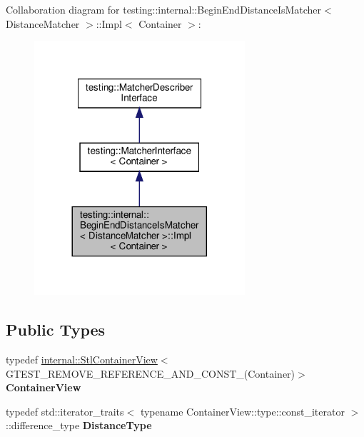 Collaboration diagram for testing\+:\+:internal\+:\+:Begin\+End\+Distance\+Is\+Matcher$<$ Distance\+Matcher $>$\+:\+:Impl$<$ Container $>$\+:
\nopagebreak
\begin{figure}[H]
\begin{center}
\leavevmode
\includegraphics[width=221pt]{classtesting_1_1internal_1_1_begin_end_distance_is_matcher_1_1_impl__coll__graph}
\end{center}
\end{figure}
\subsection*{Public Types}
\begin{DoxyCompactItemize}
\item 
\mbox{\label{classtesting_1_1internal_1_1_begin_end_distance_is_matcher_1_1_impl_a5c76ede38c6143430f56e02e9024f535}} 
typedef \hyperlink{classtesting_1_1internal_1_1_stl_container_view}{internal\+::\+Stl\+Container\+View}$<$ G\+T\+E\+S\+T\+\_\+\+R\+E\+M\+O\+V\+E\+\_\+\+R\+E\+F\+E\+R\+E\+N\+C\+E\+\_\+\+A\+N\+D\+\_\+\+C\+O\+N\+S\+T\+\_\+(Container)$>$ {\bfseries Container\+View}
\item 
\mbox{\label{classtesting_1_1internal_1_1_begin_end_distance_is_matcher_1_1_impl_a10d901c49e2793dae6bcce6fa1a4e9fe}} 
typedef std\+::iterator\+\_\+traits$<$ typename Container\+View\+::type\+::const\+\_\+iterator $>$\+::difference\+\_\+type {\bfseries Distance\+Type}
\end{DoxyCompactItemize}
